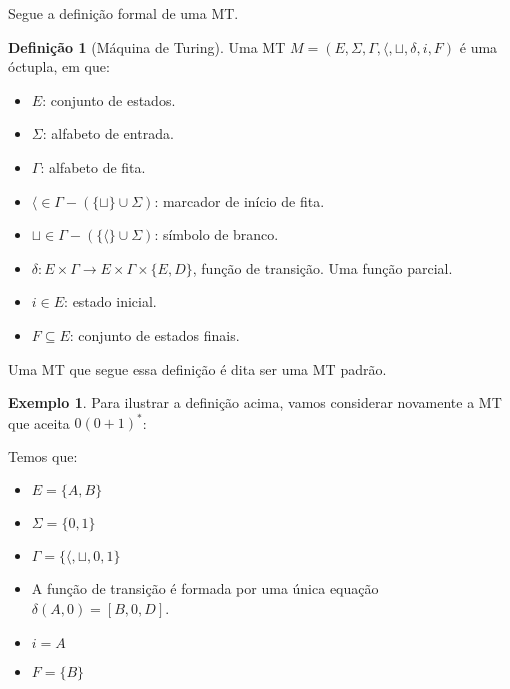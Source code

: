 \documentclass[a4paper]{article}
\theoremstyle{definition}
\newtheorem{Example}{Exemplo}
\newtheorem{Definition}{Definição}
\begin{document}
 Segue a definição formal de uma MT.
 
 \begin{Definition}[Máquina de Turing]
   Uma MT $M = (E,\Sigma,\Gamma,\langle, \sqcup, \delta, i, F)$ é uma óctupla,
   em que:
   \begin{itemize}
      \item $E$: conjunto de estados.
      \item $\Sigma$: alfabeto de entrada.
      \item $\Gamma$: alfabeto de fita.
      \item $\langle \in \Gamma - (\{\sqcup\} \cup \Sigma)$: marcador de início
        de fita.
      \item $\sqcup \in \Gamma - (\{\langle\} \cup \Sigma)$: símbolo de branco.
      \item $\delta : E \times \Gamma \to E \times \Gamma \times \{E,D\}$,
        função de transição. Uma função parcial.
      \item $i \in E$: estado inicial.
      \item $F\subseteq E$: conjunto de estados finais.
    \end{itemize}
    Uma MT que segue essa definição é dita ser uma MT padrão. 
 \end{Definition}

 \begin{Example}
   Para ilustrar a definição acima, vamos considerar novamente a MT que aceita
   $0(0+1)^*$:
    \begin{figure}[H]
      \centering
    \end{figure}
    Temos que:
    \begin{itemize}
      \item $E =\{A,B\}$
      \item $\Sigma =\{0,1\}$
      \item $\Gamma = \{\langle, \sqcup, 0, 1\}$
      \item A função de transição é formada por uma única equação $\delta(A,0) =
        [B,0,D]$.
      \item $i = A$
      \item $F =\{B\}$
    \end{itemize}   
 \end{Example}
\end{document}
